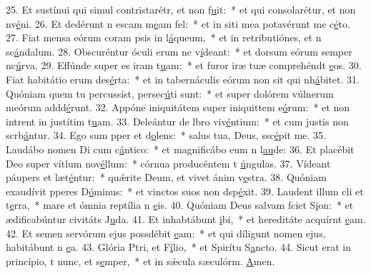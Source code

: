 25. Et sustínui qui simul contristarétr, et non f\uline{u}it:~* et qui consolarétur, et non nv\uline{é}ni.
26. Et dedérunt n escam m\uline{e}am fel:~* et in siti mea potavérunt me c\uline{é}to.
27. Fiat mensa eórum coram psis in l\uline{á}queum,~* et in retributiónes, et n sc\uline{á}ndalum.
28. Obscuréntur óculi erum ne v\uline{í}deant:~* et dorsum eórum semper nc\uline{ú}rva.
29. Effúnde super es iram t\uline{u}am:~* et furor iræ tuæ comprehéndt \uline{e}os.
30. Fiat habitátio erum des\uline{é}rta:~* et in tabernáculis eórum non sit qui nh\uline{á}bitet.
31. Quóniam quem tu percussíst, persec\uline{ú}ti sunt:~* et super dolórem vúlnerum meórum addd\uline{é}runt.
32. Appóne iniquitátem super iniquittem e\uline{ó}rum:~* et non intrent in justítim t\uline{u}am.
33. Deleántur de lbro viv\uline{é}ntium:~* et cum justis non scrb\uline{á}ntur.
34. Ego sum pper et d\uline{o}lens:~* salus tua, Deus, ssc\uline{é}pit me.
35. Laudábo nomen Di cum c\uline{á}ntico:~* et magnificábo eum n l\uline{au}de:
36. Et placébit Deo super vítlum nov\uline{é}llum:~* córnua producéntem t \uline{ú}ngulas.
37. Vídeant páupers et læt\uline{é}ntur:~* quǽrite Deum, et vivet ánim v\uline{e}stra.
38. Quóniam exaudívit pperes D\uline{ó}minus:~* et vinctos suos non dsp\uline{é}xit.
39. Laudent illum cli et t\uline{e}rra,~* mare et ómnia reptília n \uline{e}is.
40. Quóniam Deus salvam fciet S\uline{i}on:~* et ædificabúntur civitáts J\uline{u}da.
41. Et inhabtábunt \uline{i}bi,~* et hereditáte acquírnt \uline{e}am.
42. Et semen servórum ejus possdébit \uline{e}am:~* et qui díligunt nomen ejus, habitábunt n \uline{e}a.
43. Glória Ptri, et F\uline{í}lio,~* et Spirítu S\uline{a}ncto.
44. Sicut erat in princípio, t nunc, et s\uline{e}mper,~* et in sǽcula sæculórm. \uline{A}men.
